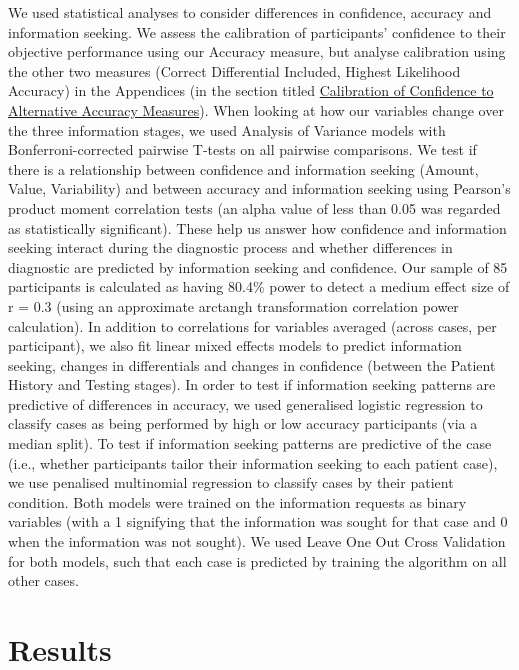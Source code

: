 \documentclass[a4paper, nobind]{templates/ociamthesis}
\begin{document}
\hfill\break
We used statistical analyses to consider differences in confidence, accuracy and information seeking. We assess the calibration of participants' confidence to their objective performance using our Accuracy measure, but analyse calibration using the other two measures (Correct Differential Included, Highest Likelihood Accuracy) in the Appendices (in the section titled \hyperref[calibrations]{Calibration of Confidence to Alternative Accuracy Measures}). When looking at how our variables change over the three information stages, we used Analysis of Variance models with Bonferroni-corrected pairwise T-tests on all pairwise comparisons. We test if there is a relationship between confidence and information seeking (Amount, Value, Variability) and between accuracy and information seeking using Pearson's product moment correlation tests (an alpha value of less than 0.05 was regarded as statistically significant). These help us answer how confidence and information seeking interact during the diagnostic process and whether differences in diagnostic are predicted by information seeking and confidence. Our sample of 85 participants is calculated as having 80.4\% power to detect a medium effect size of r = 0.3 (using an approximate arctangh transformation correlation power calculation). In addition to correlations for variables averaged (across cases, per participant), we also fit linear mixed effects models to predict information seeking, changes in differentials and changes in confidence (between the Patient History and Testing stages). In order to test if information seeking patterns are predictive of differences in accuracy, we used generalised logistic regression to classify cases as being performed by high or low accuracy participants (via a median split). To test if information seeking patterns are predictive of the case (i.e., whether participants tailor their information seeking to each patient case), we use penalised multinomial regression to classify cases by their patient condition. Both models were trained on the information requests as binary variables (with a 1 signifying that the information was sought for that case and 0 when the information was not sought). We used Leave One Out Cross Validation for both models, such that each case is predicted by training the algorithm on all other cases.

\section{Results}\label{results-1}
\end{document}

